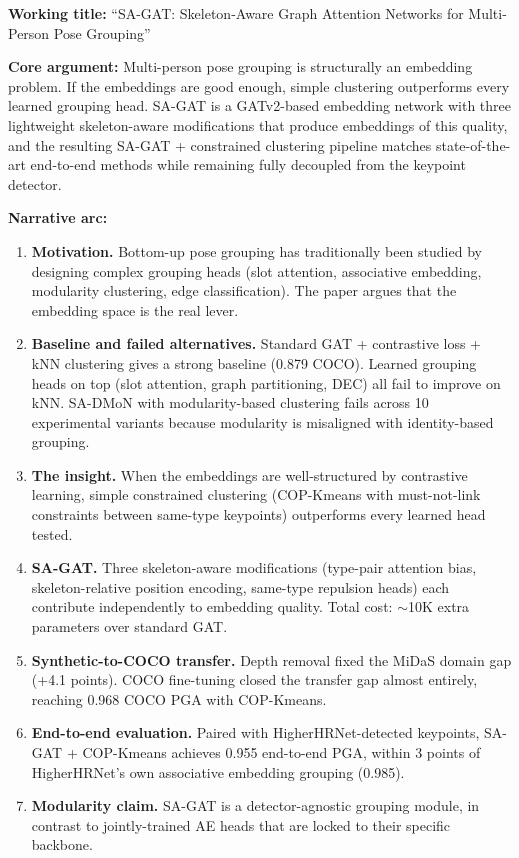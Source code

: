 \textbf{Working title:} ``SA-GAT: Skeleton-Aware Graph Attention Networks for Multi-Person Pose Grouping''

\textbf{Core argument:} Multi-person pose grouping is structurally an embedding problem. If the embeddings are good enough, simple clustering outperforms every learned grouping head. SA-GAT is a GATv2-based embedding network with three lightweight skeleton-aware modifications that produce embeddings of this quality, and the resulting SA-GAT + constrained clustering pipeline matches state-of-the-art end-to-end methods while remaining fully decoupled from the keypoint detector.

\textbf{Narrative arc:}
\begin{enumerate}
    \item \textbf{Motivation.} Bottom-up pose grouping has traditionally been studied by designing complex grouping heads (slot attention, associative embedding, modularity clustering, edge classification). The paper argues that the embedding space is the real lever.
    \item \textbf{Baseline and failed alternatives.} Standard GAT + contrastive loss + kNN clustering gives a strong baseline (0.879 COCO). Learned grouping heads on top (slot attention, graph partitioning, DEC) all fail to improve on kNN. SA-DMoN with modularity-based clustering fails across 10 experimental variants because modularity is misaligned with identity-based grouping.
    \item \textbf{The insight.} When the embeddings are well-structured by contrastive learning, simple constrained clustering (COP-Kmeans with must-not-link constraints between same-type keypoints) outperforms every learned head tested.
    \item \textbf{SA-GAT.} Three skeleton-aware modifications (type-pair attention bias, skeleton-relative position encoding, same-type repulsion heads) each contribute independently to embedding quality. Total cost: $\sim$10K extra parameters over standard GAT.
    \item \textbf{Synthetic-to-COCO transfer.} Depth removal fixed the MiDaS domain gap (+4.1 points). COCO fine-tuning closed the transfer gap almost entirely, reaching 0.968 COCO PGA with COP-Kmeans.
    \item \textbf{End-to-end evaluation.} Paired with HigherHRNet-detected keypoints, SA-GAT + COP-Kmeans achieves 0.955 end-to-end PGA, within 3 points of HigherHRNet's own associative embedding grouping (0.985).
    \item \textbf{Modularity claim.} SA-GAT is a detector-agnostic grouping module, in contrast to jointly-trained AE heads that are locked to their specific backbone.
\end{enumerate}


